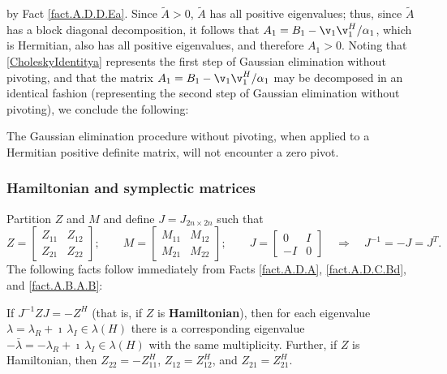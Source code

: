 by Fact \ref{fact.A.D.D.Ea}.  Since $\tilde A>0$, $\tilde A$ has all positive eigenvalues; thus, since $\tilde A$ has a block diagonal decomposition,
it follows that $A_1=B_1-\v_1 \v_1^H/ \alpha_1$, which is Hermitian, also has all positive eigenvalues, and therefore $A_1>0$.  Noting that \eqref{CholeskyIdentitya}
represents the first step of Gaussian elimination without pivoting, and that the matrix $A_1=B_1-\v_1 \v_1^H/ \alpha_1$ may be decomposed in an identical fashion (representing
the second step of Gaussian elimination without pivoting), we conclude the following:

\begin{fact} \label{fact.A.D.D.Eg}
The Gaussian elimination procedure without pivoting, when applied to a Hermitian positive definite matrix, will not encounter a zero pivot.
\end{fact}

\subsubsection{Hamiltonian and symplectic matrices} \label{sec.A.D.D.B}

Partition $Z$ and $M$ and define $J=J_{2n\times 2n}$ such that
\begin{equation*}
Z = \begin{bmatrix} Z_{11} & Z_{12} \\ Z_{21} & Z_{22} \end{bmatrix}; \qquad
M = \begin{bmatrix} M_{11} & M_{12} \\ M_{21} & M_{22} \end{bmatrix}; \qquad
J = \begin{bmatrix} 0 & I \\ -I & 0 \end{bmatrix} \quad \Rightarrow \quad J^{-1} = - J = J^T.
\end{equation*}
The following facts follow immediately from Facts \ref{fact.A.D.A}, \ref{fact.A.D.C.Bd}, and \ref{fact.A.B.A.B}:

\begin{fact} \label{fact.A.D.D.Ec}
If $J^{-1} Z J = -Z^H$ (that is, if $Z$ is {\bf Hamiltonian}),
then for each eigenvalue $\lambda= \lambda_{R}+\imath\,\lambda_{I} \in \lambda(H)$
there is a corresponding eigenvalue $-\bar\lambda = -\lambda_{R}+\imath\,\lambda_{I} \in \lambda(H)$
with the same multiplicity.  Further, if $Z$ is Hamiltonian, then $Z_{22}=-Z_{11}^H$, $Z_{12}=Z_{12}^H$, and $Z_{21}=Z_{21}^H$.
\end{fact}

